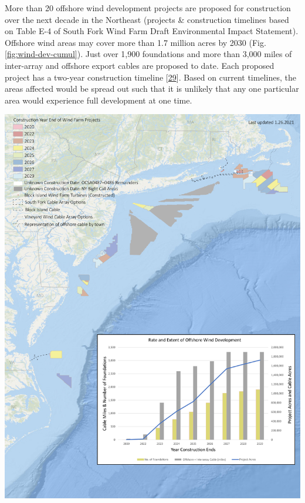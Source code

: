 \documentclass[
  10pt,
]{article}
\let\origfigure\figure
\let\endorigfigure\endfigure
\renewenvironment{figure}[1][2] {
    \expandafter\origfigure\expandafter[H]
} {
    \endorigfigure
}
\begin{document}
More than 20 offshore wind development projects are proposed for
construction over the next decade in the Northeast (projects \&
construction timelines based on Table E-4 of South Fork Wind Farm Draft
Environmental Impact Statement). Offshore wind areas may cover more than
1.7 million acres by 2030 (Fig. \ref{fig:wind-dev-cumul}). Just over
1,900 foundations and more than 3,000 miles of inter-array and offshore
export cables are proposed to date. Each proposed project has a two-year
construction timeline
{[}\protect\hyperlink{ref-boem_bureau_2021}{29}{]}. Based on current
timelines, the areas affected would be spread out such that it is
unlikely that any one particular area would experience full development
at one time.\\

\begin{figure}

{\centering \includegraphics[width=0.9\linewidth]{images/All_2021128_needsgraph-01} 

}

\caption{All Northeast Project areas by year construction ends (each project has 2 year construction period). Data for cumulative project areas, number of foundations, offshore cable area (acres) and offshore cable and interarray cable (mile) are displayed in the graph.}\label{fig:wind-dev-cumul}
\end{figure}
\end{document}
